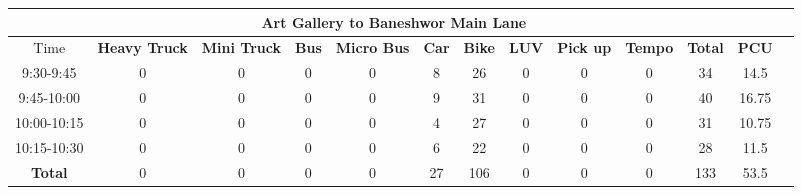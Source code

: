 \begin{landscape}
\begin{table}[h!]
\vspace{0.5cm}
\begin{tabular}{|c|c|c|c|c|c|c|c|c|c|c|c|c|}
    \hline
    \multicolumn{12}{|c|}{\textbf{Art Gallery to Baneshwor Main Lane}} \\
    \hline
        Time & \textbf{Heavy Truck} & \textbf{Mini Truck} & \textbf{Bus} & \textbf{Micro Bus} & \textbf{Car} & \textbf{Bike} & \textbf{LUV} & \textbf{Pick up} & \textbf{Tempo} & \textbf{\textbf{Total}} & \textbf{PCU} \\
    \hline
9:30-9:45	&0	&0	&0	&0	&8	&26	&0	&0	&0	&34	&14.5 \\ \hline
9:45-10:00	&0	&0	&0	&0	&9	&31	&0	&0	&0	&40	&16.75 \\ \hline
10:00-10:15	&0	&0	&0	&0	&4	&27	&0	&0	&0	&31	&10.75 \\ \hline
10:15-10:30	&0	&0	&0	&0	&6	&22	&0	&0	&0	&28	&11.5 \\ \hline
\textbf{Total}	&0	&0	&0	&0	&27	&106	&0	&0	&0	&133	&53.5 \\ \hline

\end{tabular}

\end{table}
\end{landscape}

